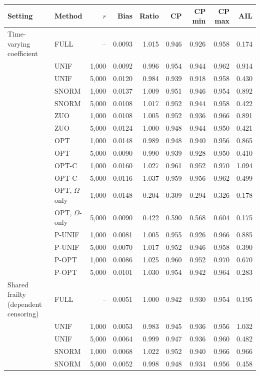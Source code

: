 \begin{tabular}{llrrrrrrr}
\toprule
Setting & Method & \(r\) & Bias & Ratio & CP & CP min & CP max & AIL\\
\midrule
Time-varying coefficient & FULL & -- & 0.0093 & 1.015 & 0.946 & 0.926 & 0.958 & 0.174\\
 & UNIF & 1,000 & 0.0092 & 0.996 & 0.954 & 0.944 & 0.962 & 0.914\\
 & UNIF & 5,000 & 0.0120 & 0.984 & 0.939 & 0.918 & 0.958 & 0.430\\
 & SNORM & 1,000 & 0.0137 & 1.009 & 0.951 & 0.946 & 0.954 & 0.892\\
 & SNORM & 5,000 & 0.0108 & 1.017 & 0.952 & 0.944 & 0.958 & 0.422\\
 & ZUO & 1,000 & 0.0108 & 1.005 & 0.952 & 0.936 & 0.966 & 0.891\\
 & ZUO & 5,000 & 0.0124 & 1.000 & 0.948 & 0.944 & 0.950 & 0.421\\
 & OPT & 1,000 & 0.0148 & 0.989 & 0.948 & 0.940 & 0.956 & 0.865\\
 & OPT & 5,000 & 0.0090 & 0.990 & 0.939 & 0.928 & 0.950 & 0.410\\
 & OPT-C & 1,000 & 0.0160 & 1.027 & 0.961 & 0.952 & 0.970 & 1.094\\
 & OPT-C & 5,000 & 0.0116 & 1.037 & 0.959 & 0.956 & 0.962 & 0.499\\
 & OPT, \(\Omega\)-only & 1,000 & 0.0148 & 0.204 & 0.309 & 0.294 & 0.326 & 0.178\\
 & OPT, \(\Omega\)-only & 5,000 & 0.0090 & 0.422 & 0.590 & 0.568 & 0.604 & 0.175\\
 & P-UNIF & 1,000 & 0.0081 & 1.005 & 0.955 & 0.926 & 0.966 & 0.885\\
 & P-UNIF & 5,000 & 0.0070 & 1.017 & 0.952 & 0.946 & 0.958 & 0.390\\
 & P-OPT & 1,000 & 0.0086 & 1.025 & 0.960 & 0.952 & 0.970 & 0.670\\
 & P-OPT & 5,000 & 0.0101 & 1.030 & 0.954 & 0.942 & 0.964 & 0.283\\
\addlinespace
Shared frailty (dependent censoring) & FULL & -- & 0.0051 & 1.000 & 0.942 & 0.930 & 0.954 & 0.195\\
 & UNIF & 1,000 & 0.0053 & 0.983 & 0.945 & 0.936 & 0.956 & 1.032\\
 & UNIF & 5,000 & 0.0064 & 0.999 & 0.947 & 0.936 & 0.960 & 0.482\\
 & SNORM & 1,000 & 0.0068 & 1.022 & 0.952 & 0.940 & 0.966 & 0.966\\
 & SNORM & 5,000 & 0.0052 & 0.998 & 0.948 & 0.934 & 0.956 & 0.458\\

\end{tabular}
